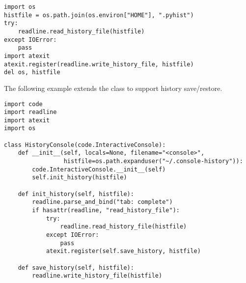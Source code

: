 \begin{verbatim}
import os
histfile = os.path.join(os.environ["HOME"], ".pyhist")
try:
    readline.read_history_file(histfile)
except IOError:
    pass
import atexit
atexit.register(readline.write_history_file, histfile)
del os, histfile
\end{verbatim}

The following example extends the  class to
support history save/restore.

\begin{verbatim}
import code
import readline
import atexit
import os

class HistoryConsole(code.InteractiveConsole):
    def __init__(self, locals=None, filename="<console>",
                 histfile=os.path.expanduser("~/.console-history")):
        code.InteractiveConsole.__init__(self)
        self.init_history(histfile)

    def init_history(self, histfile):
        readline.parse_and_bind("tab: complete")
        if hasattr(readline, "read_history_file"):
            try:
                readline.read_history_file(histfile)
            except IOError:
                pass
            atexit.register(self.save_history, histfile)

    def save_history(self, histfile):
        readline.write_history_file(histfile)
\end{verbatim}

